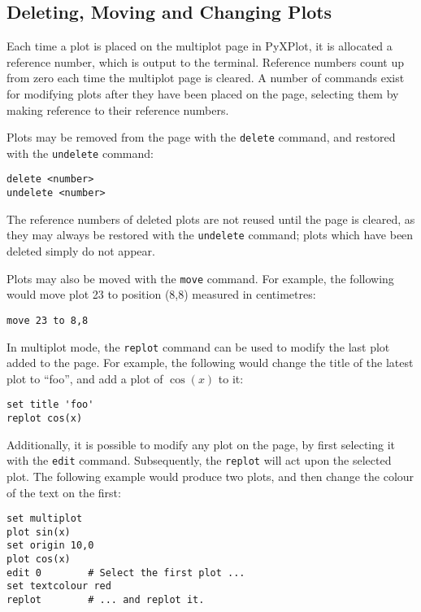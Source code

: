 \documentclass[a4paper,onecolumn,11pt]{book}
\begin{document}
\subsection{Deleting, Moving and Changing Plots}

Each time a plot is placed on the multiplot page in PyXPlot, it is allocated a
reference number, which is output to the terminal. Reference numbers count up
from zero each time the multiplot page is cleared. A number of commands exist
for modifying plots after they have been placed on the page, selecting them by
making reference to their reference numbers.

Plots may be removed from the page with the \texttt{delete} command, and
restored with the \texttt{undelete} command:

\begin{verbatim} 
delete <number>
undelete <number>
\end{verbatim}

The reference numbers of deleted plots are not reused until the page is
cleared, as they may always be restored with the \texttt{undelete} command;
plots which have been deleted simply do not appear.

Plots may also be moved with the \texttt{move} command. For example, the
following would move plot 23 to position (8,8) measured in centimetres:

\begin{verbatim} 
move 23 to 8,8
\end{verbatim}

In multiplot mode, the \texttt{replot} command can be used to modify the last
plot added to the page. For example, the following would change the title of
the latest plot to ``foo'', and add a plot of $\cos(x)$ to it:

\begin{verbatim} 
set title 'foo'
replot cos(x)
\end{verbatim}

Additionally, it is possible to modify any plot on the page, by first selecting
it with the \texttt{edit} command. Subsequently, the \texttt{replot} will act
upon the selected plot. The following example would produce two plots, and then
change the colour of the text on the first:

\begin{verbatim} 
set multiplot
plot sin(x)
set origin 10,0
plot cos(x)
edit 0        # Select the first plot ...
set textcolour red
replot        # ... and replot it.
\end{verbatim}
\end{document}
